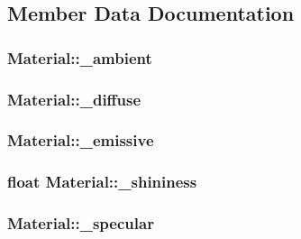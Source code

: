 \subsection{Member Data Documentation}
\hypertarget{class_material_a8631fe4ccaea32b5f83d618490ed1a94}{
\subsubsection[{\+\_\+ambient}]{ Material\+::\+\_\+ambient\hspace{0.3cm}{\ttfamily [private]}}}\label{class_material_a8631fe4ccaea32b5f83d618490ed1a94}
\hypertarget{class_material_ac6d5a21fb938c37d981ff904baa139ce}{
\subsubsection[{\+\_\+diffuse}]{ Material\+::\+\_\+diffuse\hspace{0.3cm}{\ttfamily [private]}}}\label{class_material_ac6d5a21fb938c37d981ff904baa139ce}
\hypertarget{class_material_a48f498add75d2e7b0022b3f34271e22b}{
\subsubsection[{\+\_\+emissive}]{ Material\+::\+\_\+emissive\hspace{0.3cm}{\ttfamily [private]}}}\label{class_material_a48f498add75d2e7b0022b3f34271e22b}
\hypertarget{class_material_ae3f666b9de93b770232ebb5b1b3ee47e}{
\subsubsection[{\+\_\+shininess}]{\setlength{\rightskip}{0pt plus 5cm}float Material\+::\+\_\+shininess\hspace{0.3cm}{\ttfamily [private]}}}\label{class_material_ae3f666b9de93b770232ebb5b1b3ee47e}
\hypertarget{class_material_aa86eef19901a701e22ef3ddd7b9c8ec2}{
\subsubsection[{\+\_\+specular}]{ Material\+::\+\_\+specular\hspace{0.3cm}{\ttfamily [private]}}}\label{class_material_aa86eef19901a701e22ef3ddd7b9c8ec2}
